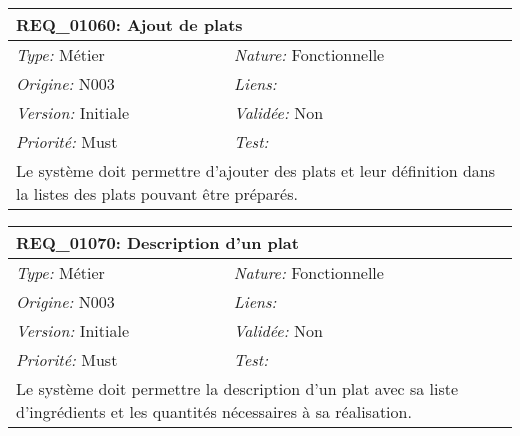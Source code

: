 \begin{table}[!ht]

\begin{tabular}{|p{60mm}p{100mm}|}

\hline

\multicolumn{2}{|l|}{\textbf{REQ\_01060:} Ajout de plats} \\ \hline

\emph{Type:} Métier & \emph{Nature:} Fonctionnelle \\

\emph{Origine:} N003 & \emph{Liens:}  \\

\emph{Version:} Initiale & \emph{Validée:} Non \\

\emph{Priorité:} Must & \emph{Test:} \\ \hline

\multicolumn{2}{|p{16cm}|}{Le système doit permettre d'ajouter des plats et leur définition dans la listes des plats pouvant être préparés.} \\ \hline

\end{tabular}

\end{table}



\begin{table}[!ht]

\begin{tabular}{|p{60mm}p{100mm}|}

\hline

\multicolumn{2}{|l|}{\textbf{REQ\_01070:} Description d'un plat} \\ \hline

\emph{Type:} Métier & \emph{Nature:} Fonctionnelle \\

\emph{Origine:} N003 & \emph{Liens:}  \\

\emph{Version:} Initiale & \emph{Validée:} Non \\

\emph{Priorité:} Must & \emph{Test:} \\ \hline

\multicolumn{2}{|p{16cm}|}{Le système doit permettre la description d'un plat avec sa liste d'ingrédients et les quantités nécessaires à sa réalisation.} \\ \hline

\end{tabular}

\end{table}



